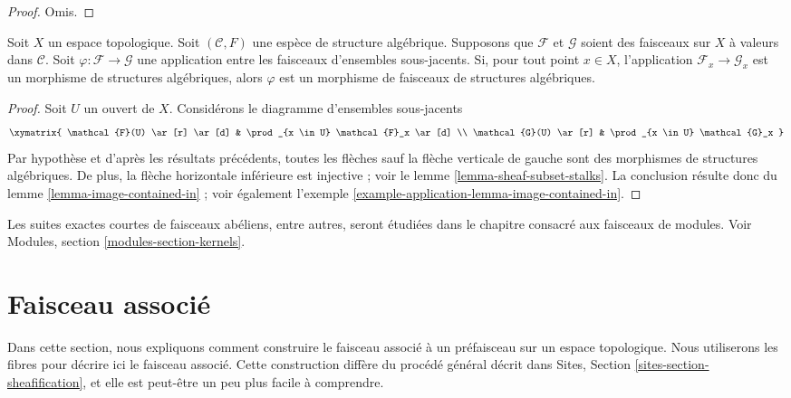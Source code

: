 \begin{proof}
Omis.
\end{proof}


\begin{lemma}
\label{lemma-check-homomorphism-stalks}
Soit $X$ un espace topologique.
Soit $(\mathcal{C}, F)$ une espèce de structure algébrique.
Supposons que $\mathcal{F}$ et $\mathcal{G}$ soient des faisceaux sur $X$ à
valeurs dans $\mathcal{C}$.
Soit $\varphi : \mathcal{F} \to \mathcal{G}$ une application entre les
faisceaux d'ensembles sous-jacents.
Si, pour tout point $x \in X$, l'application
$\mathcal{F}_x \to \mathcal{G}_x$ est un morphisme de structures
algébriques, alors $\varphi$ est un morphisme de faisceaux de structures
algébriques.
\end{lemma}

\begin{proof}
Soit $U$ un ouvert de $X$. Considérons le diagramme d'ensembles sous-jacents
$$
\xymatrix{
\mathcal{F}(U) \ar[r] \ar[d] &
\prod_{x \in U} \mathcal{F}_x \ar[d] \\
\mathcal{G}(U) \ar[r] &
\prod_{x \in U} \mathcal{G}_x
}
$$
Par hypothèse et d'après les résultats précédents, toutes les flèches sauf la
flèche verticale de gauche sont des morphismes de structures algébriques. De
plus, la flèche horizontale inférieure est injective ; voir le
lemme \ref{lemma-sheaf-subset-stalks}.
La conclusion résulte donc du lemme \ref{lemma-image-contained-in} ; voir
également l'exemple \ref{example-application-lemma-image-contained-in}.
\end{proof}

\noindent
Les suites exactes courtes de faisceaux abéliens, entre autres, seront étudiées
dans le chapitre consacré aux faisceaux de modules. Voir
Modules, section \ref{modules-section-kernels}.



\section{Faisceau associé}
\label{section-sheafification}

\noindent
Dans cette section, nous expliquons comment construire le faisceau associé
à un préfaisceau sur un espace topologique. Nous utiliserons les fibres
pour décrire ici le faisceau associé. Cette construction diffère
du procédé général décrit dans Sites, Section
\ref{sites-section-sheafification}, et elle est peut-être un peu
plus facile à comprendre.

